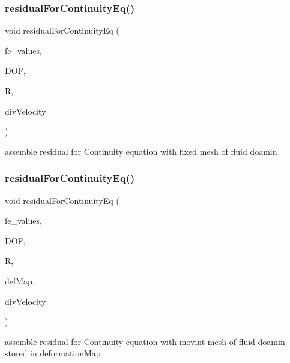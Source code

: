 \subsubsection{\texorpdfstring{residualForContinuityEq()}{residualForContinuityEq()}\hspace{0.1cm}{\footnotesize\ttfamily [1/2]}}
{\footnotesize\ttfamily void residual\+For\+Continuity\+Eq (\begin{DoxyParamCaption}\item[{const F\+E\+Values$<$ dim $>$ \&}]{fe\+\_\+values,  }\item[{unsigned int}]{D\+OF,  }\item[{Table$<$ 1, T $>$ \&}]{R,  }\item[{Table$<$ 1, T $>$ \&}]{div\+Velocity }\end{DoxyParamCaption})}

assemble residual for Continuity equation with fixed mesh of fluid doamin \mbox{\label{class_residual_afddbdda003424f242266894fdd1f7b1a}} 
\subsubsection{\texorpdfstring{residualForContinuityEq()}{residualForContinuityEq()}\hspace{0.1cm}{\footnotesize\ttfamily [2/2]}}
{\footnotesize\ttfamily void residual\+For\+Continuity\+Eq (\begin{DoxyParamCaption}\item[{const F\+E\+Values$<$ dim $>$ \&}]{fe\+\_\+values,  }\item[{unsigned int}]{D\+OF,  }\item[{Table$<$ 1, T $>$ \&}]{R,  }\item[{\mbox{\hyperlink{structdeformation_map}{deformation\+Map}}$<$ T, dim $>$ \&}]{def\+Map,  }\item[{Table$<$ 1, T $>$ \&}]{div\+Velocity }\end{DoxyParamCaption})}

assemble residual for Continuity equation with movint mesh of fluid doamin stored in deformation\+Map \mbox{\label{class_residual_a144663fb81fc60d4db0c5a8e45176e61}} 
